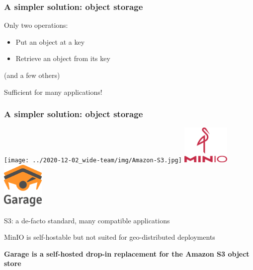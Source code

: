 \documentclass[aspectratio=169]{beamer}
\begin{document}
\begin{frame}
	\frametitle{A simpler solution: object storage}
	Only two operations:
	\vspace{1em}
	\begin{itemize}
		\item Put an object at a key
			\vspace{1em}
		\item Retrieve an object from its key
	\end{itemize}
	\vspace{1em}
	{\footnotesize (and a few others)}

	\vspace{1em}
	Sufficient for many applications!
\end{frame}

\begin{frame}
	\frametitle{A simpler solution: object storage}
		\begin{center}
			\texttt{[image: ../2020-12-02\_wide-team/img/Amazon-S3.jpg]}
			\hspace{3em}
			\includegraphics[height=5em]{assets/minio.png}
			\hspace{3em}
			\includegraphics[height=6em]{../../logo/garage_hires_crop.png}
		\end{center}
		\vspace{1em}
	S3: a de-facto standard, many compatible applications

	\vspace{1em}

	MinIO is self-hostable but not suited for geo-distributed deployments

	\vspace{1em}

	\textbf{Garage is a self-hosted drop-in replacement for the Amazon S3 object store}
\end{frame}
\end{document}
